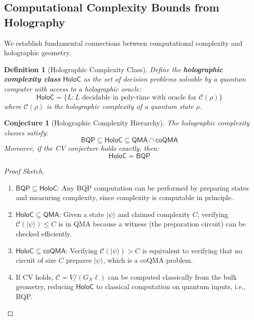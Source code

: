 \documentclass[12pt,a4paper]{article}
\newtheorem{conjecture}[theorem]{Conjecture}
\newtheorem{definition}[theorem]{Definition}
\begin{document}
\subsection{Computational Complexity Bounds from Holography}

We establish fundamental connections between computational complexity and holographic geometry.

\begin{definition}[Holographic Complexity Class]
Define the \textbf{holographic complexity class} $\mathsf{HoloC}$ as the set of decision problems solvable by a quantum computer with access to a holographic oracle:
\begin{equation}
\mathsf{HoloC} = \{ L : L \text{ decidable in poly-time with oracle for } \mathcal{C}(\rho) \}
\end{equation}
where $\mathcal{C}(\rho)$ is the holographic complexity of a quantum state $\rho$.
\end{definition}

\begin{conjecture}[Holographic Complexity Hierarchy]
The holographic complexity classes satisfy:
\begin{equation}
\mathsf{BQP} \subseteq \mathsf{HoloC} \subseteq \mathsf{QMA} \cap \mathsf{coQMA}
\end{equation}
Moreover, if the CV conjecture holds exactly, then:
\begin{equation}
\mathsf{HoloC} = \mathsf{BQP}
\end{equation}
\end{conjecture}

\begin{proof}[Proof Sketch]
\begin{enumerate}
    \item $\mathsf{BQP} \subseteq \mathsf{HoloC}$: Any BQP computation can be performed by preparing states and measuring complexity, since complexity is computable in principle.
    
    \item $\mathsf{HoloC} \subseteq \mathsf{QMA}$: Given a state $|\psi\rangle$ and claimed complexity $C$, verifying $\mathcal{C}(|\psi\rangle) \leq C$ is in QMA because a witness (the preparation circuit) can be checked efficiently.
    
    \item $\mathsf{HoloC} \subseteq \mathsf{coQMA}$: Verifying $\mathcal{C}(|\psi\rangle) > C$ is equivalent to verifying that no circuit of size $C$ prepares $|\psi\rangle$, which is a coQMA problem.
    
    \item If CV holds, $\mathcal{C} = V/(G_N \ell)$ can be computed classically from the bulk geometry, reducing $\mathsf{HoloC}$ to classical computation on quantum inputs, i.e., BQP.
\end{enumerate}
\end{proof}
\end{document}
